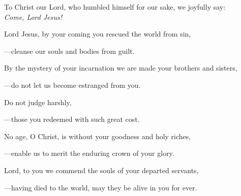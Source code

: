 \intercessions\indent

\begin{hangpar}

To Christ our Lord, who humbled himself for our sake, we joyfully say:\\
\emph{Come, Lord Jesus!}

\medskip Lord Jesus, by your coming you rescued the world from sin,

{\color{red}---\thinspace}cleanse our souls and bodies from guilt.

\medskip By the mystery of your incarnation we are made your brothers and sisters,

{\color{red}---\thinspace}do not let us become estranged from you.

\medskip Do not judge harshly,

{\color{red}---\thinspace}those you redeemed with such great cost.

\medskip No age, O Christ, is without your goodness and holy riches,

{\color{red}---\thinspace}enable us to merit the enduring crown of your glory.

\medskip Lord, to you we commend the souls of your departed servants,

{\color{red}---\thinspace}having died to the world, may they be alive in you for ever.

\medskip

\end{hangpar}